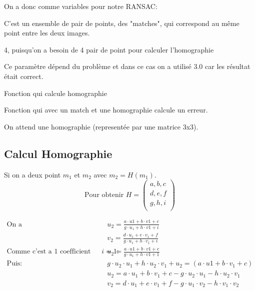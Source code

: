 \documentclass[11pt]{article}
\begin{document}
On a donc comme variables pour notre RANSAC:
\begin{description}[labelindent=16pt,style=multiline,leftmargin=7cm, noitemsep]
	\item[Données:] C’est un ensemble de pair de points, des "matches",  qui correspond au même point entre les deux images.
	\item[Nombre minimum de donnée:] 4, puisqu’on a besoin de 4 pair de point pour calculer l’homographie
	\item[Error threshold:] Ce paramètre dépend du problème et dans ce cas on a utilisé 3.0 car les résultat était correct. 
	\item[CalculateParametres:] Fonction qui calcule homographie
	\item[CalculateError:] Fonction qui avec un match et une homographie calcule un erreur.
	\item[bestFittingParameters:] On attend une homographie (representée par une matrice 3x3).
\end{description}

\subsection{Calcul Homographie}

Si on a deux point $m_1$ et $m_2$ avec $m_2 = H(m_1)$. \\
\begin{equation*}
\text{Pour obtenir } H = \begin{pmatrix}
    a, b, c \\
    d, e, f \\
    g, h, i \\
\end{pmatrix}
\end{equation*}
     
\begin{equation*}
\begin{split}
	\text{On a} \qquad & u_2 = \frac{a \cdot u1 + b \cdot v1 + c}{g \cdot u_1 + h \cdot v1 + i} \\
	& v_2 = \frac{d \cdot u_1 + e \cdot v_1 + f}{g \cdot u_1 + h \cdot v_1 + i} \\
	\text{Comme c'est a 1 coefficient près, on fix $i = 1$:} \qquad & u_2 = \frac{a \cdot u1 + b \cdot v1 + c}{g \cdot u_1 + h \cdot v1 + 1} \\
	\text{Puis:} \qquad & g \cdot u_2 \cdot u_1 + h \cdot u_2 \cdot v_1+u_2 = (a \cdot u1 + b \cdot v_1 + c) \\
	& u_2 = a \cdot u_1 + b \cdot v_1 + c - g \cdot u_2 \cdot u_1 - h \cdot u_2 \cdot v_1 \\
	& v_2 = d \cdot u_1 + e \cdot v_1 + f - g \cdot u_1 \cdot v_2 -  h \cdot v_1 \cdot v_2
\end{split}
\end{equation*}
\end{document}
